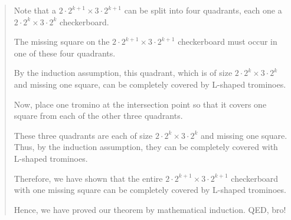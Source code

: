 \documentclass[12pt]{article}
\begin{document}
\begin{enumerate}
\begin{verse}
Note that a $2 \cdot 2^{k+1} \times 3 \cdot 2^{k+1}$ can be split into four quadrants, each one a $2 \cdot 2^{k} \times 3 \cdot 2^{k}$ checkerboard.

The missing square on the $2 \cdot 2^{k+1} \times 3 \cdot 2^{k+1}$ checkerboard must occur in one of these four quadrants. 

By the induction assumption, this quadrant, which is of size $2 \cdot 2^{k} \times 3 \cdot 2^{k}$ and missing one square, can be completely covered by L-shaped trominoes. 

Now, place one tromino at the intersection point so that it covers one square from each of the other three quadrants. 

These three quadrants are each of size $2 \cdot 2^{k} \times 3 \cdot 2^{k}$ and missing one square. Thus, by the induction assumption, they can be completely covered with L-shaped trominoes. 

Therefore, we have shown that the entire $2 \cdot 2^{k+1} \times 3 \cdot 2^{k+1}$ checkerboard with one missing square can be completely covered by L-shaped trominoes. 

Hence, we have proved our theorem by mathematical induction. QED, bro!
\end{verse}

\end{enumerate}
\end{document}
